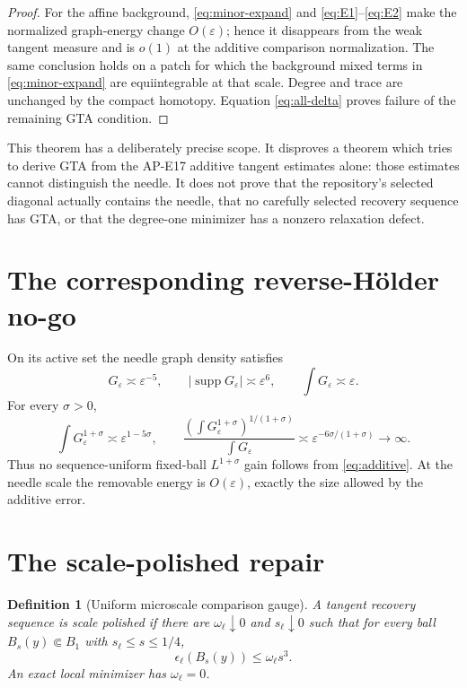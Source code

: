 \documentclass[10pt]{article}
\newtheorem{definition}[theorem]{Definition}
\begin{document}
\begin{proof}
For the affine background, \eqref{eq:minor-expand} and
\eqref{eq:E1}--\eqref{eq:E2} make the normalized graph-energy change
$O(\varepsilon)$; hence it disappears from the weak tangent measure and is
$o(1)$ at the additive comparison normalization.  The same conclusion holds
on a patch for which the background mixed terms in
\eqref{eq:minor-expand} are equiintegrable at that scale.  Degree and trace
are unchanged by the compact homotopy.  Equation \eqref{eq:all-delta} proves
failure of the remaining GTA condition.
\end{proof}

This theorem has a deliberately precise scope.  It disproves a theorem
which tries to derive GTA from the AP-E17 additive tangent estimates alone:
those estimates cannot distinguish the needle.  It does not prove that the
repository's selected diagonal actually contains the needle, that no
carefully selected recovery sequence has GTA, or that the degree-one
minimizer has a nonzero relaxation defect.

\section{The corresponding reverse-H\"older no-go}

On its active set the needle graph density satisfies
\begin{equation}
 G_\varepsilon\asymp\varepsilon^{-5},
 \qquad
 |\operatorname{supp}G_\varepsilon|\asymp\varepsilon^6,
 \qquad
 \int G_\varepsilon\asymp\varepsilon.                  \label{eq:G}
\end{equation}
For every $\sigma>0$,
\begin{equation}
 \int G_\varepsilon^{1+\sigma}
 \asymp\varepsilon^{1-5\sigma},\qquad
 \frac{\left(\int G_\varepsilon^{1+\sigma}\right)^{1/(1+\sigma)}}
      {\int G_\varepsilon}
 \asymp\varepsilon^{-6\sigma/(1+\sigma)}
 \longrightarrow\infty.                               \label{eq:RHfail}
\end{equation}
Thus no sequence-uniform fixed-ball $L^{1+\sigma}$ gain follows from
\eqref{eq:additive}.  At the needle scale the removable energy is
$O(\varepsilon)$, exactly the size allowed by the additive error.

\section{The scale-polished repair}

\begin{definition}[Uniform microscale comparison gauge]
A tangent recovery sequence is scale polished if there are
$\omega_\ell\downarrow0$ and $s_\ell\downarrow0$ such that for every ball
$B_s(y)\Subset B_1$ with $s_\ell\leq s\leq1/4$,
\begin{equation}
 \epsilon_\ell(B_s(y))
 \leq \omega_\ell s^3.                                \label{eq:polished}
\end{equation}
An exact local minimizer has $\omega_\ell=0$.
\end{definition}
\end{document}
